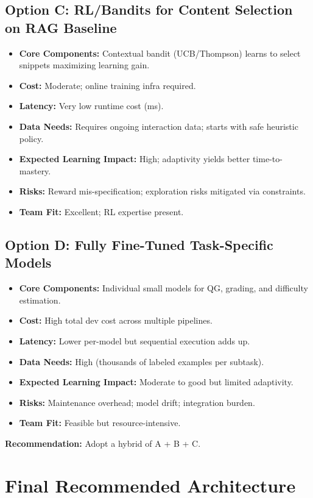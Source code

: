 \documentclass[12pt]{article}
\begin{document}
\subsection*{Option C: RL/Bandits for Content Selection on RAG Baseline}
\begin{itemize}[leftmargin=1.2cm]
  \item \textbf{Core Components:} Contextual bandit (UCB/Thompson) learns to select snippets maximizing learning gain.
  \item \textbf{Cost:} Moderate; online training infra required.
  \item \textbf{Latency:} Very low runtime cost (ms).
  \item \textbf{Data Needs:} Requires ongoing interaction data; starts with safe heuristic policy.
  \item \textbf{Expected Learning Impact:} High; adaptivity yields better time-to-mastery.
  \item \textbf{Risks:} Reward mis-specification; exploration risks mitigated via constraints.
  \item \textbf{Team Fit:} Excellent; RL expertise present.
\end{itemize}

\subsection*{Option D: Fully Fine-Tuned Task-Specific Models}
\begin{itemize}[leftmargin=1.2cm]
  \item \textbf{Core Components:} Individual small models for QG, grading, and difficulty estimation.
  \item \textbf{Cost:} High total dev cost across multiple pipelines.
  \item \textbf{Latency:} Lower per-model but sequential execution adds up.
  \item \textbf{Data Needs:} High (thousands of labeled examples per subtask).
  \item \textbf{Expected Learning Impact:} Moderate to good but limited adaptivity.
  \item \textbf{Risks:} Maintenance overhead; model drift; integration burden.
  \item \textbf{Team Fit:} Feasible but resource-intensive.
\end{itemize}

\textbf{Recommendation:} Adopt a hybrid of A + B + C.

\section{Final Recommended Architecture}
\end{document}
